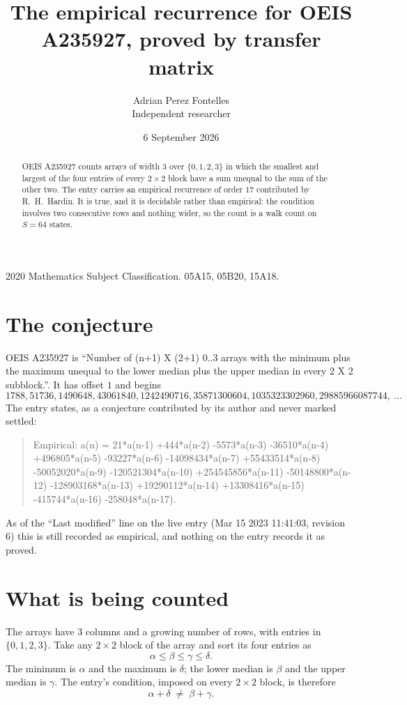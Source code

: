 \documentclass[11pt,a4paper]{article}
\title{The empirical recurrence for OEIS A235927, proved by transfer matrix}
\author{Adrian Perez Fontelles\\ \small Independent researcher}
\date{6 September 2026}
\theoremstyle{plain}
\theoremstyle{definition}
\begin{document}
\maketitle

\begin{abstract}
OEIS A235927 counts arrays of width $3$ over $\{0,1,2,3\}$ in which the smallest and largest of the
four entries of every $2\times2$ block have a sum unequal to the sum of the other two. The entry
carries an empirical recurrence of order $17$ contributed by R.~H.~Hardin. It is true, and
it is decidable rather than empirical: the condition involves two consecutive rows and nothing
wider, so the count is a walk count on $S=64$ states.
\end{abstract}

\noindent\small 2020 Mathematics Subject Classification. 05A15, 05B20, 15A18.\normalsize

\section{The conjecture}

OEIS A235927 is ``Number of (n+1) X (2+1) 0..3 arrays with the minimum plus the maximum unequal to the lower median plus the upper median in every 2 X 2 subblock.''. It has offset $1$ and begins
\[
1788, 51736, 1490648, 43061840, 1242490716, 35871300604, 1035323302960, 29885966087744,\ \dots
\]
The entry states, as a conjecture contributed by its author and never marked settled:
\begin{quote}
Empirical: a(n) = 21*a(n-1) +444*a(n-2) -5573*a(n-3) -36510*a(n-4) +496805*a(n-5) -93227*a(n-6) -14098434*a(n-7) +55433514*a(n-8) -50052020*a(n-9) -120521304*a(n-10) +254545856*a(n-11) -50148800*a(n-12) -128903168*a(n-13) +19290112*a(n-14) +13308416*a(n-15) -415744*a(n-16) -258048*a(n-17).
\end{quote}
As of the ``Last modified'' line on the live entry (Mar 15 2023 11:41:03, revision 6) this is still
recorded as empirical, and nothing on the entry records it as proved.

\section{What is being counted}

The arrays have $3$ columns and a growing number of rows, with entries in $\{0,1,2,3\}$. Take any
$2\times2$ block of the array and sort its four entries as
\[
\alpha\le\beta\le\gamma\le\delta .
\]
The minimum is $\alpha$ and the maximum is $\delta$; the lower median is $\beta$ and the upper
median is $\gamma$. The entry's condition, imposed on every $2\times2$ block, is therefore
\[
\alpha+\delta\;\neq\;\beta+\gamma .
\]
\end{document}
